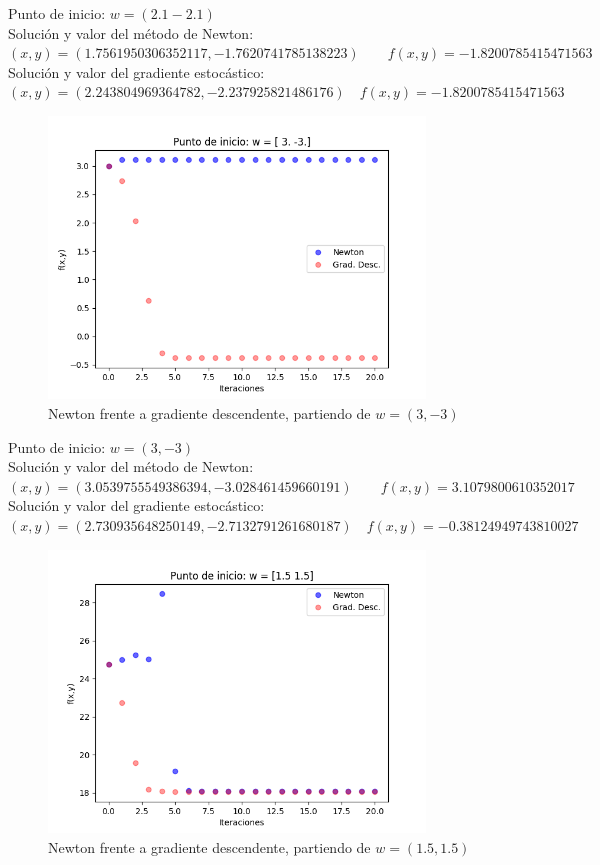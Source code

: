 \documentclass[a4]{article}
\begin{document}
Punto de inicio: $w=(2.1 -2.1)$ \\
Solución y valor del método de Newton: \\
$(x,y) = ( 1.7561950306352117 ,  -1.7620741785138223 ) \qquad
f(x,y) =  -1.8200785415471563$ \\
Solución y valor del gradiente estocástico: \\
$(x,y) = ( 2.243804969364782 ,  -2.237925821486176 ) \quad
f(x,y) =  -1.8200785415471563$

\begin{figure}[H]
    \centering    
    \includegraphics[width=100mm]{imgs/newton-grad_2.png}
    \caption{Newton frente a gradiente descendente, partiendo de $w=(3, -3)$}
    \label{fig:newton-grad_2}
\end{figure}

Punto de inicio: $w=(3, -3)$ \\
Solución y valor del método de Newton: \\
$(x,y) = ( 3.0539755549386394 ,  -3.028461459660191 ) \qquad
f(x,y) =  3.1079800610352017$ \\
Solución y valor del gradiente estocástico: \\
$(x,y) = ( 2.730935648250149 ,  -2.7132791261680187 ) \quad
f(x,y) =  -0.38124949743810027$

\begin{figure}[H]
    \centering    
    \includegraphics[width=100mm]{imgs/newton-grad_3.png}
    \caption{Newton frente a gradiente descendente, partiendo de $w=(1.5, 1.5)$}
    \label{fig:newton-grad_3}
\end{figure}
\end{document}

